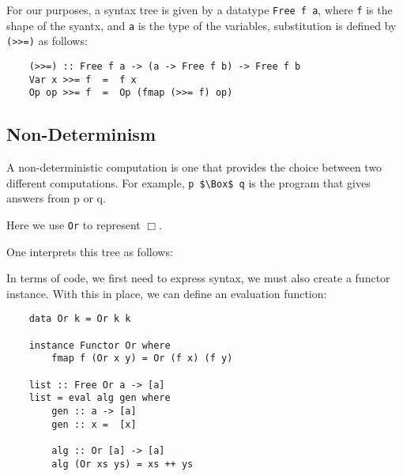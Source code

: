 \documentclass[a4paper,12pt]{article}
\theoremstyle{remark}
\begin{document}
For our purposes, a syntax tree is given by a datatype \lstinline{Free f a}, where \lstinline{f} is the shape of the syantx,
and \lstinline{a} is the type of the variables, substitution is defined by \lstinline{(>>=)} as follows:

\begin{lstlisting}
    (>>=) :: Free f a -> (a -> Free f b) -> Free f b
    Var x >>= f  =  f x
    Op op >>= f  =  Op (fmap (>>= f) op)  \end{lstlisting}

\subsection{Non-Determinism}

A non-deterministic computation is one that provides the choice between two different computations.
For example, \lstinline{p $\Box$ q} is the program that gives answers from p or q.

\begin{figure}[H]
  \centering
\end{figure}

Here we use \lstinline{Or} to represent $\Box$.

\begin{figure}[H]
  \centering
\end{figure}

One interprets this tree as follows:

\begin{figure}[H]
  \centering
\end{figure}

In terms of code, we first need to express syntax, we must also create a functor instance.
With this in place, we can define an evaluation function:

\begin{lstlisting}
    data Or k = Or k k

    instance Functor Or where
        fmap f (Or x y) = Or (f x) (f y)

    list :: Free Or a -> [a]
    list = eval alg gen where
        gen :: a -> [a]
        gen :: x =  [x]

        alg :: Or [a] -> [a]
        alg (Or xs ys) = xs ++ ys  \end{lstlisting}
\end{document}
